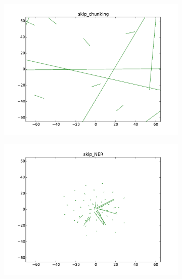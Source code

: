 \begin{figure}
\caption{Updated vs. no-updated word representations for POS-tagging and chunking using skip-gram}
\centering
\begin{subfigure}[b]{0.48\textwidth}
	\centering
    \includegraphics[width=\textwidth]{plots/vectorField/Lizhen/scaled/Lizhen_skip_chunking}
	\label{fig:skipChu}
\end{subfigure}
\begin{subfigure}[b]{0.48\textwidth}
	\centering
    \includegraphics[width=\textwidth]{plots/vectorField/Lizhen/scaled/Lizhen_skip_NER}    	
	\label{fig:skippos}
\end{subfigure}
\label{fig:vectorfield}
\end{figure}

